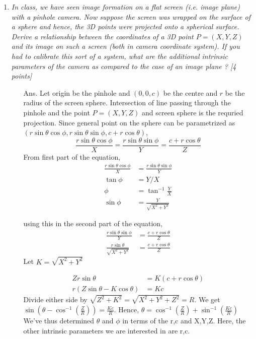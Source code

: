\documentclass[11pt]{article}
\begin{document}
\maketitle

\begin{enumerate}
\item \textit{In class, we have seen image formation on a flat screen (i.e. image plane) with a pinhole camera. Now suppose the screen was wrapped on the surface of a sphere and hence, the 3D points were projected onto a spherical surface. Derive a relationship between the coordinates of a 3D point $P = (X,Y,Z)$ and its image on such a screen (both in camera coordinate system). If you had to calibrate this sort of a system, what are the additional intrinsic parameters of the camera as compared to the case of an image plane ? \textsf{[4 points]}}
\begin{itemize}
	\item[Ans.] Let origin be the pinhole and $(0,0,c)$ be the centre and $r$ be the radius of the screen sphere. Intersection of line passing through the pinhole and the point $P = (X,Y,Z)$ and screen sphere is the requried projection.
	Since general point on the sphere can be parametrized as $(r\sin{\theta}\cos{\phi}, r\sin{\theta}\sin{\phi}, c+r\cos{\theta})$,
	\[	\frac{r\sin{\theta}\cos{\phi}}{X} = \frac{r\sin{\theta}\sin{\phi}}{Y} = \frac{c+r\cos{\theta}}{Z}
	\]
	From first part of the equation,
	\begin{align}
		\frac{r\sin{\theta}\cos{\phi}}{X} &= \frac{r\sin{\theta}\sin{\phi}}{Y}\\
		\tan{\phi} &= Y/X  \\
		\phi &= \tan ^{-1}{\frac{Y}{X}} \\
		\sin{\phi} &= \frac{Y}{\sqrt{X^2+Y^2}}
	\end{align}

	using this in the second part of the equation,
	\begin{align}
		\frac{r\sin{\theta}\sin{\phi}}{Y} &= \frac{c+r\cos{\theta}}{Z}\\
		\frac{r\sin{\theta}}{\sqrt{X^2+Y^2}} &= \frac{c+r\cos{\theta}}{Z}		 
	\end{align}
	Let $K=\sqrt{X^2+Y^2}$

	\begin{align}
	 Zr\sin{\theta}&=K(c+r\cos{\theta})\\
	 r(Z\sin{\theta}-K\cos{\theta})&=Kc	  
	\end{align}
	Divide either side by $\sqrt{Z^2+K^2}=\sqrt{X^2+Y^2+Z^2}=R$.
	We get $\sin(\theta-\cos^{-1}(\frac{Z}{R}))=\frac{Kc}{R}$. Hence,
	$\theta=\cos^{-1}(\frac{Z}{R})+\sin^{-1}(\frac{Kc}{R})$
We've thus determined $\theta$ and $\phi$ in terms of the r,c and X,Y,Z. Here, the other intrinsic parameters we are interested in are r,c. 
	

\end{itemize}
\end{enumerate}
\end{document}
